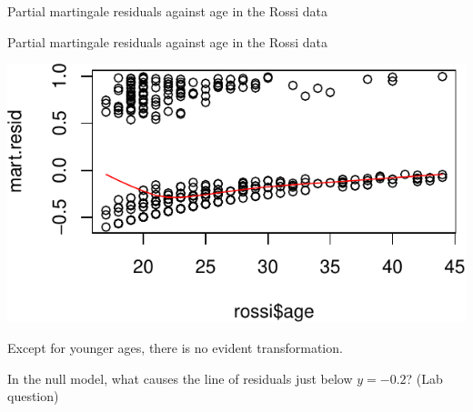 \documentclass[ignorenonframetext,]{beamer}
\newenvironment{Shaded}{\begin{snugshade}}{\end{snugshade}}
\newcommand{\DataTypeTok}[1]{\textcolor[rgb]{0.13,0.29,0.53}{#1}}
\newcommand{\KeywordTok}[1]{\textcolor[rgb]{0.13,0.29,0.53}{\textbf{#1}}}
\newcommand{\NormalTok}[1]{#1}
\newcommand{\OperatorTok}[1]{\textcolor[rgb]{0.81,0.36,0.00}{\textbf{#1}}}
\newcommand{\StringTok}[1]{\textcolor[rgb]{0.31,0.60,0.02}{#1}}
\begin{document}
\begin{frame}[fragile]{%
\protect\hypertarget{partial-martingale-residuals-against-age-in-the-rossi-data}{%
Partial martingale residuals against age in the Rossi data}}

\footnotesize

\begin{Shaded}
\end{Shaded}

\end{frame}

\begin{frame}{%
\protect\hypertarget{partial-martingale-residuals-against-age-in-the-rossi-data-1}{%
Partial martingale residuals against age in the Rossi data}}

\footnotesize

\includegraphics{unit_05_ph_reg_spec_topics_files/figure-beamer/unnamed-chunk-6-1.pdf}

Except for younger ages, there is no evident transformation.

In the null model, what causes the line of residuals just below
\(y = -0.2\)? (Lab question)

\end{frame}
\end{document}
